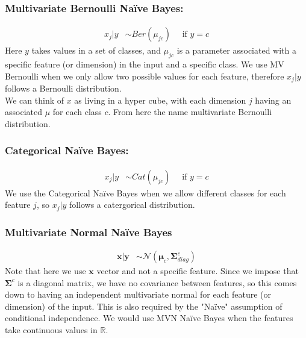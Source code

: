 \documentclass{article}
\renewcommand{\v}{\boldsymbol}
\begin{document}
    \subsubsection{Multivariate Bernoulli Na\"ive Bayes:}
        \begin{align}
            x_j|y &\sim Ber(\mu_{jc}) ~~~~~~\text{if $y=c$}
        \end{align}
        Here $y$ takes values in a set of classes, and $\mu_{jc}$ is a parameter associated with a specific feature (or dimension) in the input and a specific class. We use MV Bernoulli when we only allow two possible values for each feature, therefore $x_j|y$ follows a Bernoulli distribution.\\
        We can think of $x$ as living in a hyper cube, with each dimension $j$ having an associated $\mu$ for each class $c$. From here the name multivariate Bernoulli distribution. 
    
    \subsubsection{Categorical Na\"ive Bayes:}
        \begin{align}
            x_j|y &\sim Cat(\mu_{jc}) ~~~~~~\text{if $y=c$}
        \end{align}
        We use the Categorical Na\"ive Bayes when we allow different classes for each feature $j$, so $x_j|y$ follows a catergorical distribution.
        
    \subsubsection{Multivariate Normal Na\"ive Bayes}
        \begin{align}
            \v x| \v y &\sim \mathcal{N}(\v \mu_c, \v \Sigma_{diag}^c)
        \end{align}    
        Note that here we use $\v x$ vector and not a specific feature. Since we impose that $\v \Sigma^c$ is a diagonal matrix, we have no covariance between features, so this comes down to having an independent multivariate normal for each feature (or dimension) of the input. This is also required by the "Na\"ive" assumption of conditional independence. We would use  MVN Na\"ive Bayes when the features take continuous values in $\mathbb{R}$. 
        
\end{document}

